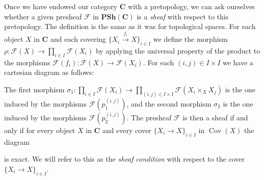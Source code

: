 \documentclass[12pt,reqno,a4paper]{amsart}
\theoremstyle{plain}
\theoremstyle{definition}
\theoremstyle{remark}
\begin{document}
Once we have endowed our category $\mathbf{C}$ with a pretopology, we can ask ourselves whether a given presheaf $\mathscr{F}$ in $\mathbf{PSh}(\mathbf{C})$ is a \textit{sheaf} with respect to this pretopology.
The definition is the same as it was for topological spaces.
For each object $X$ in $\mathbf{C}$ and each covering $\{ X_{i} \xrightarrow{f_{i}} X \}_{i \in I}$ we define the morphism $\rho \colon \mathscr{F}(X) \to \prod_{i \in I} \mathscr{F}(X_{i})$ by applying the universal property of the product to the morphisms $\mathscr{F}(f_{i}) \colon \mathscr{F}(X) \to \mathscr{F}(X_{i})$.
For each $(i, j) \in I \times I$ we have a cartesian diagram as follows:
\begin{center}
\end{center}
The first morphism $\sigma_{1} \colon \prod_{i \in I} \mathscr{F}(X_{i}) \to \prod_{(i, j) \in I \times I} \mathscr{F}(X_{i} \times_{X} X_{j})$ is the one induced by the morphisms $\mathscr{F}(p_{1}^{(i,j)})$, and the second morphism $\sigma_{2}$ is the one induced by the morphisms $\mathscr{F}(p_{2}^{(i,j)})$.
The presheaf $\mathscr{F}$ is then a sheaf if and only if for every object $X$ in $\mathbf{C}$ and every cover $\{ X_{i} \to X \}_{i \in I}$ in $\operatorname{Cov}(X)$ the diagram
\begin{center}
\end{center}
is exact.
We will refer to this as the \textit{sheaf condition} with respect to the cover $\{ X_{i} \to X \}_{i \in I}$.
\end{document}
